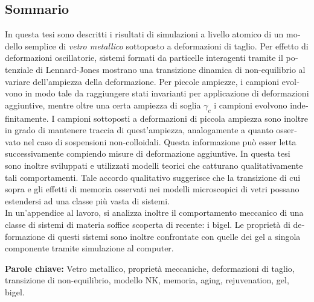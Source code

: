 \begin{otherlanguage}{italian}
\clearpage
\chapter*{Sommario}
In questa tesi sono descritti i risultati di simulazioni a livello atomico di un modello semplice di \emph{vetro metallico} sottoposto a deformazioni di taglio. Per effetto di deformazioni oscillatorie, sistemi formati da particelle interagenti tramite il potenziale di Lennard-Jones mostrano una transizione dinamica di non-equilibrio al variare dell'ampiezza della deformazione. Per piccole ampiezze, i campioni evolvono in modo tale da raggiungere stati invarianti per applicazione di deformazioni aggiuntive, mentre oltre una certa ampiezza di soglia $\gamma_{c}$ i campioni evolvono indefinitamente.
I campioni sottoposti a deformazioni di piccola ampiezza sono inoltre in grado di mantenere traccia di quest'ampiezza, analogamente a quanto osservato nel caso di sospensioni non-colloidali. Questa informazione pu\`o esser letta successivamente compiendo misure di deformazione aggiuntive.
In questa tesi sono inoltre sviluppati e utilizzati modelli teorici che catturano qualitativamente tali comportamenti. Tale accordo qualitativo suggerisce che la transizione di cui sopra e gli effetti di memoria osservati nei modelli microscopici di vetri possano estendersi ad una classe pi\`u vasta di sistemi. \\
In un'appendice al lavoro, si analizza inoltre il comportamento meccanico di una classe di sistemi di materia soffice scoperta di recente: i bigel. Le propriet\`a di deformazione di questi sistemi sono inoltre confrontate con quelle dei gel a singola componente tramite simulazione al computer.

\vspace{2cm}

\textbf{Parole chiave:} Vetro metallico, propriet\`a meccaniche, deformazioni di taglio, transizione di non-equilibrio, modello NK, memoria, aging, rejuvenation, gel, bigel. 

\end{otherlanguage}



